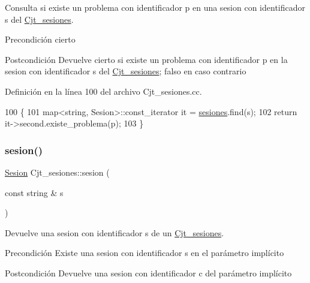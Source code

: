 Consulta si existe un problema con identificador p en una sesion con identificador s del \mbox{\hyperlink{class_cjt__sesiones}{Cjt\+\_\+sesiones}}. 

\begin{DoxyPrecond}{Precondición}
cierto 
\end{DoxyPrecond}
\begin{DoxyPostcond}{Postcondición}
Devuelve cierto si existe un problema con identificador p en la sesion con identificador s del \mbox{\hyperlink{class_cjt__sesiones}{Cjt\+\_\+sesiones}}; falso en caso contrario 
\end{DoxyPostcond}


Definición en la línea 100 del archivo Cjt\+\_\+sesiones.\+cc.


\begin{DoxyCode}
100                                                                              \{
101       map<string, Sesion>::const\_iterator it = \mbox{\hyperlink{class_cjt__sesiones_a87e835a62e561eeb0f93eedbdcbe1802}{sesiones}}.find(s);
102       \textcolor{keywordflow}{return} it->second.existe\_problema(p);
103     \}
\end{DoxyCode}
\mbox{\label{class_cjt__sesiones_a9e0c9082d6baad2a6ab002fcbfefc8ea}} 
\subsubsection{\texorpdfstring{sesion()}{sesion()}}
{\footnotesize\ttfamily \mbox{\hyperlink{class_sesion}{Sesion}} Cjt\+\_\+sesiones\+::sesion (\begin{DoxyParamCaption}\item[{const string \&}]{s }\end{DoxyParamCaption})}



Devuelve una sesion con identificador s de un \mbox{\hyperlink{class_cjt__sesiones}{Cjt\+\_\+sesiones}}. 

\begin{DoxyPrecond}{Precondición}
Existe una sesion con identificador s en el parámetro implícito 
\end{DoxyPrecond}
\begin{DoxyPostcond}{Postcondición}
Devuelve una sesion con identificador c del parámetro implícito 
\end{DoxyPostcond}


